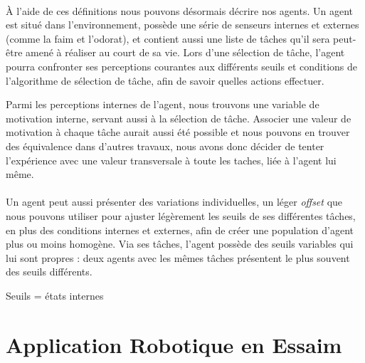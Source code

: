 		\paragraph{}
		À l'aide de ces définitions nous pouvons désormais décrire nos agents. Un agent est situé dans l'environnement, possède une série de senseurs internes et externes (comme la faim et l'odorat), et contient aussi une liste de tâches qu'il sera peut-être amené à réaliser au court de sa vie. Lors d'une sélection de tâche, l'agent pourra confronter ses perceptions courantes aux différents seuils et conditions de l'algorithme de sélection de tâche, afin de savoir quelles actions effectuer.
		
		Parmi les perceptions internes de l'agent, nous trouvons une variable de motivation interne, servant aussi à la sélection de tâche. Associer une valeur de motivation à chaque tâche aurait aussi été possible et nous pouvons en trouver des équivalence dans d'autres travaux, nous avons donc décider de tenter l'expérience avec une valeur transversale à toute les taches, liée à l'agent lui même.
		
		\paragraph{}
		Un agent peut aussi présenter des variations individuelles, un léger \textit{offset} que nous pouvons utiliser pour ajuster légèrement les seuils de ses différentes tâches, en plus des conditions internes et externes, afin de créer une population d'agent plus ou moins homogène. Via ses tâches, l'agent possède des seuils variables qui lui sont propres : deux agents avec les mêmes tâches présentent le plus souvent des seuils différents.
		
		Seuils = états internes
		
	\section{Application Robotique en Essaim}
	
